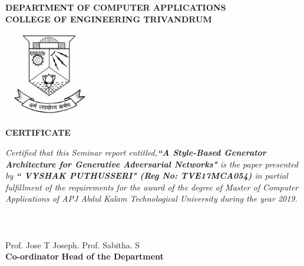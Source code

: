 
\begin{titlepage}
\begin{center}
\textbf{DEPARTMENT OF COMPUTER APPLICATIONS}\\[0.5cm]
\textbf{ COLLEGE OF ENGINEERING TRIVANDRUM}\\
[0.5cm]
\vspace{1.2cm}
\includegraphics[width=0.30\textwidth]{./cet}\\
\vspace{0.8cm}
\textbf{CERTIFICATE}\\
\end{center}
\emph{Certified that this Seminar report entitled,\textbf{``A Style-Based Generator Architecture for Generative Adversarial Networks"} is the paper presented by \textbf{`` VYSHAK PUTHUSSERI" (Reg No: TVE17MCA054)} in partial fulfillment of the requirements for the award of the degree of Master of Computer Applications of APJ Abdul Kalam Technological University during the year 2019.}\\\\\\\\
\vspace{0.5cm}
Prof. Jose T Joseph.
\hspace{9.5cm}
Prof. Sabitha. S\\ 
\hspace{3.9cm} \textbf{Co-ordinator}
\hspace{9.2cm}
\textbf{Head of the Department}

\end{titlepage}
